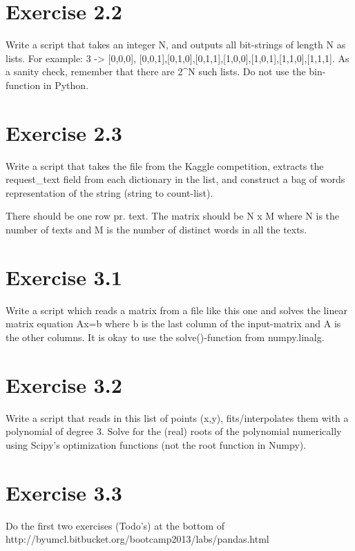 \documentclass{article}
\begin{document}
\section{Exercise 2.2}
Write a script that takes an integer N, and outputs all bit-strings of length N as lists. For example: 3 -> [0,0,0], [0,0,1],[0,1,0],[0,1,1],[1,0,0],[1,0,1],[1,1,0],[1,1,1]. As a sanity check, remember that there are 2^N such lists. Do not use the bin-function in Python.


\section{Exercise 2.3}
Write a script that takes the file from the Kaggle competition, extracts the request_text field from each dictionary in the list, and construct a bag of words representation of the string (string to count-list).

There should be one row pr. text. The matrix should be N x M where N is the number of texts and M is the number of distinct words in all the texts.


\section{Exercise 3.1}
Write a script which reads a matrix from a file like this one and solves the linear matrix equation Ax=b where b is the last column of the input-matrix and A is the other columns. It is okay to use the solve()-function from numpy.linalg.


\section{Exercise 3.2}
Write a script that reads in this list of points (x,y), fits/interpolates them with a polynomial of degree 3. Solve for the (real) roots of the polynomial numerically using Scipy’s optimization functions (not the root function in Numpy).


\section{Exercise 3.3}
Do the first two exercises (Todo’s) at the bottom of http://byumcl.bitbucket.org/bootcamp2013/labs/pandas.html

\end{document}
